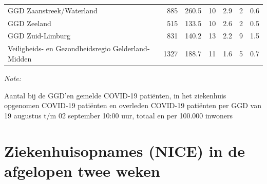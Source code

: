 \documentclass[
  english,
  man,floatsintext]{apa6}
\begin{document}
\begin{table}
\begin{threeparttable}
\begin{tabular}{lrrrrrr}
GGD Zaanstreek/Waterland & 885 & 260.5 & 10 & 2.9 & 2 & 0.6\\
GGD Zeeland & 515 & 133.5 & 10 & 2.6 & 2 & 0.5\\
GGD Zuid-Limburg & 831 & 140.2 & 13 & 2.2 & 9 & 1.5\\
Veiligheids- en Gezondheidsregio Gelderland-Midden & 1327 & 188.7 & 11 & 1.6 & 5 & 0.7\\
\bottomrule
\end{tabular}
\begin{tablenotes}
\item \textit{Note: } 
\item Aantal bij de GGD’en gemelde COVID-19 patiënten, in het ziekenhuis opgenomen COVID-19 patiënten en overleden COVID-19 patiënten per GGD van 19 augustus t/m 02 september 10:00 uur, totaal en per 100.000 inwoners
\end{tablenotes}
\end{threeparttable}
\endgroup{}
\end{table}

\newpage

\hypertarget{ziekenhuisopnames-nice-in-de-afgelopen-twee-weken}{%
\section{Ziekenhuisopnames (NICE) in de afgelopen twee weken}\label{ziekenhuisopnames-nice-in-de-afgelopen-twee-weken}}
\end{document}
